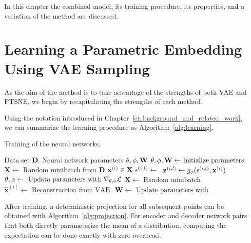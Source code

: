 In this chapter the combined model, its training procedure, its properties, and a variation of the method are discussed.

\section{Learning a Parametric Embedding Using VAE Sampling}

As the aim of the method is to take advantage of the strengths of both VAE and PTSNE, we begin by recapitulating the strengths of each method.


Using the notation introduced in Chapter~\ref{ch:background_and_related_work}, we can summarize the learning procedure as Algorithm~\ref{alg:learning}.

\begin{algorithm}[H]
  \caption{Training of the neural networks.}
  \label{alg:learning}
  \begin{algorithmic}[1]
    \Require Data set $\mathbf{D}$.
    \Ensure Neural network parameters $\mathbf{\theta}, \mathbf{\phi}, \mathbf{W}$
    \State $\mathbf{\theta}, \mathbf{\phi}, \mathbf{W} \gets \text{Initialize parameters}$
      \State $\mathbf{X} \gets \text{ Random minibatch from } \mathbf{D}$
      \ForAll $\mathbf{x}^{(i)} \in \mathbf{X}$
        \State $\mathbf{\epsilon}^{(i,l)} \gets$ 
        \State $\mathbf{z}^{(i,l)} \gets g_{\mathbf{\phi}}(\mathbf{\epsilon}^{(i,l)}, \mathbf{x}^{(i)})$
        \State $\mathbf{\theta}, \mathbf{\phi} \gets \text{ Updata parameters with } \nabla_{\mathbf{\theta}, \mathbf{\phi}} \mathcal{L}$
      \EndFor
    \EndWhile
      \State $\mathbf{X} \gets \text{ Random minibatch }$
      \State $\hat{\mathbf{x}}^{(i)} \gets \text{ Reconstruction from VAE }$ 
      \State $\mathbf{W} \gets \text{ Update parameters with }$
    \EndWhile
  \end{algorithmic}
\end{algorithm}


After training, a deterministic projection for all subsequent points can be obtained with Algorithm~\ref{alg:projection}. For encoder and decoder network pairs that both directly parameterize the mean of a distribution, computing the expectation can be done exactly with zero overhead.

